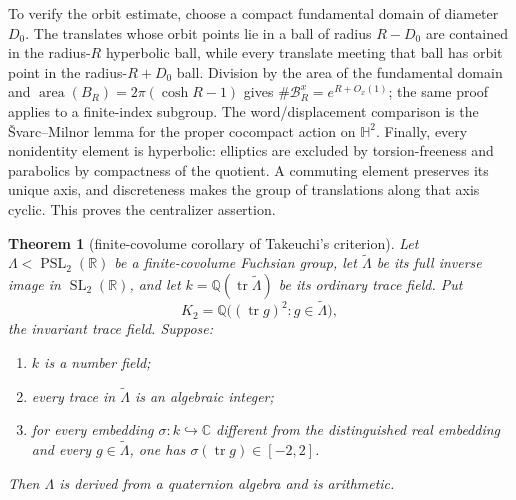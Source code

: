 \documentclass[11pt,reqno]{amsart}
\newtheorem{theorem}{Theorem}[section]
\theoremstyle{definition}
\theoremstyle{remark}
\newcommand{\R}{\mathbb R}
\newcommand{\C}{\mathbb C}
\newcommand{\Q}{\mathbb Q}
\newcommand{\cB}{\mathcal B}
\newcommand{\Tr}{\operatorname{tr}}
\newcommand{\SL}{\operatorname{SL}}
\newcommand{\PSL}{\operatorname{PSL}}
\begin{document}
To verify the orbit estimate, choose a compact fundamental domain of
diameter \(D_0\).
The translates whose orbit points lie in a ball of radius \(R-D_0\) are
contained in the radius-\(R\) hyperbolic ball, while every translate meeting
that ball has orbit point in the radius-\(R+D_0\) ball.  Division by the
area of the fundamental domain and
\(\operatorname{area}(B_R)=2\pi(\cosh R-1)\) gives
\(\#\cB_R^x=e^{R+O_x(1)}\); the same proof applies to a finite-index
subgroup.  The word/displacement comparison is the
\v{S}varc--Milnor lemma for the proper cocompact action on
\(\mathbb H^2\).  Finally, every nonidentity element is hyperbolic:
elliptics are excluded by torsion-freeness and parabolics by compactness of
the quotient.  A commuting element preserves its unique axis, and
discreteness makes the group of translations along that axis cyclic.  This
proves the centralizer assertion.

\begin{theorem}[finite-covolume corollary of Takeuchi's criterion]
\label{input:takeuchi}
Let \(\Lambda<\PSL_2(\R)\) be a finite-covolume Fuchsian group, let
\(\widetilde\Lambda\) be its full inverse image in \(\SL_2(\R)\), and let
\(k=\Q(\Tr\widetilde\Lambda)\) be its ordinary trace field.  Put
\[
 K_2=\Q\bigl((\Tr g)^2:g\in\widetilde\Lambda\bigr),
\]
the invariant trace field.  Suppose:
\begin{enumerate}[label=\textup{(\roman*)}]
\item \(k\) is a number field;
\item every trace in \(\widetilde\Lambda\) is an algebraic integer;
\item for every embedding \(\sigma:k\hookrightarrow\C\) different from
the distinguished real embedding and every
\(g\in\widetilde\Lambda\), one has
\(\sigma(\Tr g)\in[-2,2]\).
\end{enumerate}
Then \(\Lambda\) is derived from a quaternion algebra and is arithmetic.
\end{theorem}
\end{document}
